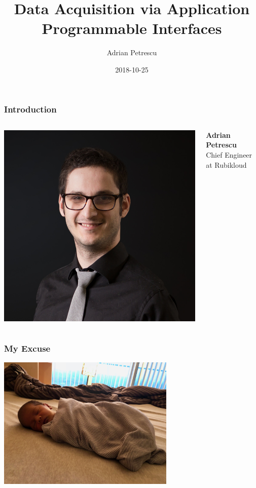\documentclass{beamer}
\title[Data Acquisition via APIs]{Data Acquisition via Application Programmable Interfaces}
\author{Adrian Petrescu}
\institute{Rubikloud}
\date{2018-10-25}
\begin{document}
\frame{\titlepage}


\begin{frame}
  \frametitle{Introduction}

  \begin{columns}

    \includegraphics{img/speaker-headshot.png}

    \textbf{Adrian Petrescu} \\
    Chief Engineer at Rubikloud
  \end{columns}
\end{frame}

\begin{frame}
  \frametitle{My Excuse}
  \begin{center}
    \includegraphics[width=320]{img/calvin.jpg}
  \end{center}
\end{frame}
\end{document}
